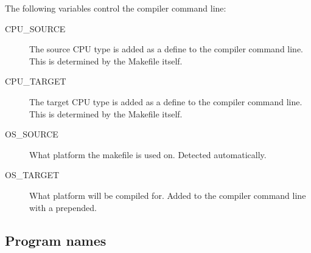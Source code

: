 The following variables control the compiler command line:
\begin{description}

\item[CPU\_SOURCE] The source CPU type is added as a define to the compiler
command line. This is determined by the Makefile itself.

\item[CPU\_TARGET] The target CPU type is added as a define to the compiler
command line. This is determined by the Makefile itself.

\item[OS\_SOURCE] What platform the makefile is used on. Detected
automatically.

\item[OS\_TARGET] What platform will be compiled for. Added to the
compiler command line with a  prepended.
\end{description}


\subsection{Program names}

